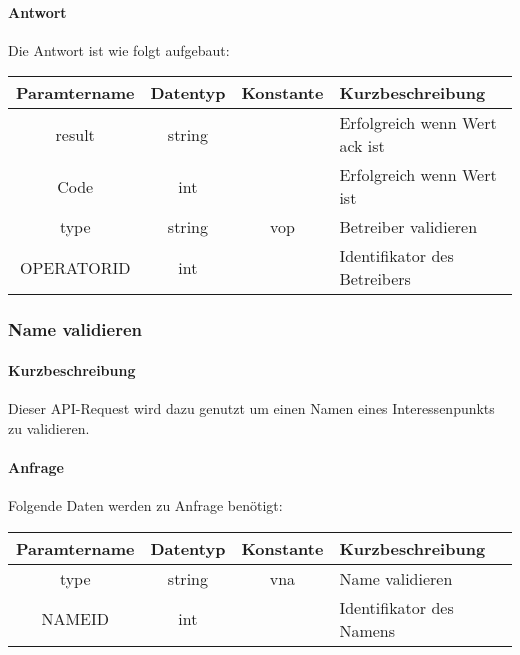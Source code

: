 \paragraph{Antwort}Die Antwort ist wie folgt aufgebaut:
\begin{table}[H]
	\begin{tabular}{|c|c|c|p{6.5cm}|}
		\hline
		\textbf{Paramtername} & \textbf{Datentyp} & \textbf{Konstante} & \textbf{Kurzbeschreibung}                                                                                               \\ \hline
		result              & string           &                 & Erfolgreich wenn Wert {\glqq ack\grqq} ist \\ \hline
		Code                & int              &                 & Erfolgreich wenn Wert {\glqq 0\grqq} ist \\ \hline
		type                & string           & vop             & Betreiber validieren \\ \hline
		OPERATORID          & int              &                 & Identifikator des Betreibers \\ \hline
	\end{tabular}
\end{table}
\subsubsection{Name validieren}
\paragraph{Kurzbeschreibung}Dieser API-Request wird dazu genutzt um einen Namen eines Interessenpunkts zu validieren.
\paragraph{Anfrage}Folgende Daten werden zu Anfrage benötigt:
\begin{table}[H]
	\begin{tabular}{|c|c|c|p{6.5cm}|}
		\hline
		\textbf{Paramtername} & \textbf{Datentyp} & \textbf{Konstante} & \textbf{Kurzbeschreibung}                                                                                               \\ \hline
		type                & string            & vna                & Name validieren \\ \hline
		NAMEID              & int               &                    & Identifikator des Namens \\ \hline
	\end{tabular}
\end{table}
